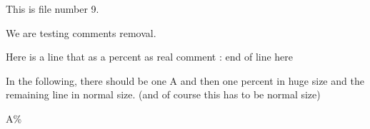 This is file number 9.

We are testing comments removal. 

Here is a line that as a percent as real comment : end of line here%


In the following, there should be one A and then one percent in huge size and the remaining line in normal size. (and of course this has to be normal size)

\huge

A\% 




